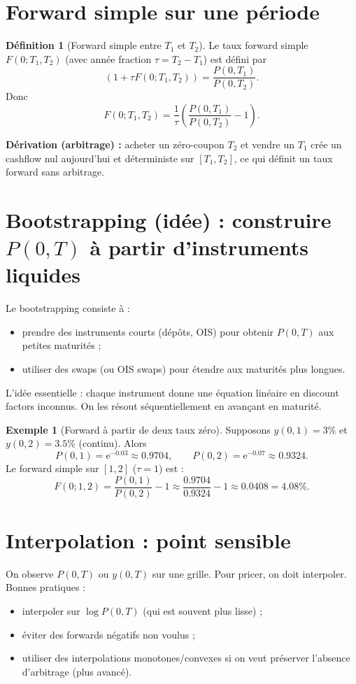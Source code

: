 \documentclass[11pt,a4paper]{report}
\newcommand{\ee}{\mathrm{e}}
\newcommand{\1}{\mathbbm{1}}
\theoremstyle{definition}
\newtheorem{definition}{Définition}[chapter]
\newtheorem{example}{Exemple}[chapter]
\theoremstyle{plain}
\theoremstyle{remark}
\begin{document}
\section{Forward simple sur une période}
\begin{definition}[Forward simple entre $T_1$ et $T_2$]
Le taux forward simple $F(0;T_1,T_2)$ (avec année fraction $\tau=T_2-T_1$) est défini par
\[
(1+\tau F(0;T_1,T_2)) = \frac{P(0,T_1)}{P(0,T_2)}.
\]
Donc
\[
F(0;T_1,T_2) = \frac{1}{\tau}\left(\frac{P(0,T_1)}{P(0,T_2)}-1\right).
\]
\end{definition}

\textbf{Dérivation (arbitrage) :}
acheter un zéro-coupon $T_2$ et vendre un $T_1$ crée un cashflow nul aujourd'hui et déterministe sur $[T_1,T_2]$,
ce qui définit un taux forward sans arbitrage.

\section{Bootstrapping (idée) : construire $P(0,T)$ à partir d'instruments liquides}
Le bootstrapping consiste à :
\begin{itemize}
  \item prendre des instruments courts (dépôts, OIS) pour obtenir $P(0,T)$ aux petites maturités ;
  \item utiliser des swaps (ou OIS swaps) pour étendre aux maturités plus longues.
\end{itemize}
L'idée essentielle : chaque instrument donne une équation linéaire en discount factors inconnus.
On les résout séquentiellement en avançant en maturité.

\begin{example}[Forward à partir de deux taux zéro]
Supposons $y(0,1)=3\%$ et $y(0,2)=3.5\%$ (continu).
Alors
\[
P(0,1)=\ee^{-0.03}\approx 0.9704,\qquad P(0,2)=\ee^{-0.07}\approx 0.9324.
\]
Le forward simple sur $[1,2]$ ($\tau=1$) est :
\[
F(0;1,2)=\frac{P(0,1)}{P(0,2)}-1 \approx \frac{0.9704}{0.9324}-1\approx 0.0408 = 4.08\%.
\]
\end{example}

\section{Interpolation : point sensible}
On observe $P(0,T)$ ou $y(0,T)$ sur une grille.
Pour pricer, on doit interpoler.
Bonnes pratiques :
\begin{itemize}
  \item interpoler sur $\log P(0,T)$ (qui est souvent plus lisse) ;
  \item éviter des forwards négatifs non voulus ;
  \item utiliser des interpolations monotones/convexes si on veut préserver l'absence d'arbitrage (plus avancé).
\end{itemize}
\end{document}
